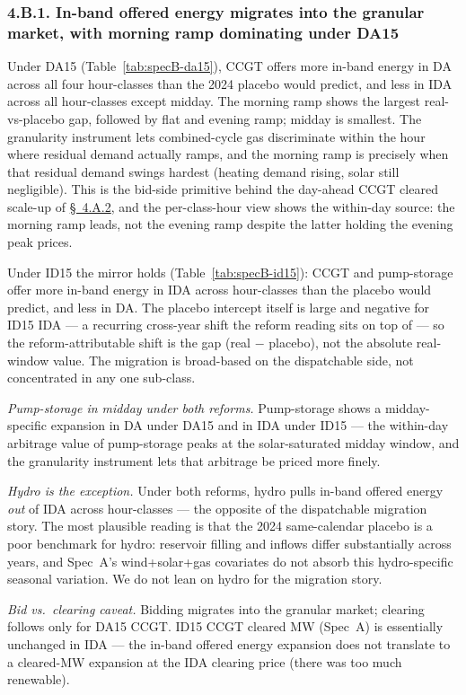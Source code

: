 \documentclass[11pt]{article}
\begin{document}
\subsubsection*{4.B.1. In-band offered energy migrates into the granular market, with morning ramp dominating under DA15}\label{sec:4v}
Under DA15 (Table~\ref{tab:specB-da15}), CCGT offers more in-band energy in DA across all four hour-classes than the 2024 placebo would predict, and less in IDA across all hour-classes except midday. The morning ramp shows the largest real-vs-placebo gap, followed by flat and evening ramp; midday is smallest. The granularity instrument lets combined-cycle gas discriminate within the hour where residual demand actually ramps, and the morning ramp is precisely when that residual demand swings hardest (heating demand rising, solar still negligible). This is the bid-side primitive behind the day-ahead CCGT cleared scale-up of \hyperref[sec:4iii]{\S~4.A.2}, and the per-class-hour view shows the within-day source: the morning ramp leads, not the evening ramp despite the latter holding the evening peak prices.

Under ID15 the mirror holds (Table~\ref{tab:specB-id15}): CCGT and pump-storage offer more in-band energy in IDA across hour-classes than the placebo would predict, and less in DA. The placebo intercept itself is large and negative for ID15 IDA --- a recurring cross-year shift the reform reading sits on top of --- so the reform-attributable shift is the gap (real $-$ placebo), not the absolute real-window value. The migration is broad-based on the dispatchable side, not concentrated in any one sub-class.

\emph{Pump-storage in midday under both reforms.} Pump-storage shows a midday-specific expansion in DA under DA15 and in IDA under ID15 --- the within-day arbitrage value of pump-storage peaks at the solar-saturated midday window, and the granularity instrument lets that arbitrage be priced more finely.

\emph{Hydro is the exception.} Under both reforms, hydro pulls in-band offered energy \emph{out} of IDA across hour-classes --- the opposite of the dispatchable migration story. The most plausible reading is that the 2024 same-calendar placebo is a poor benchmark for hydro: reservoir filling and inflows differ substantially across years, and Spec~A's wind+solar+gas covariates do not absorb this hydro-specific seasonal variation. We do not lean on hydro for the migration story.

\emph{Bid vs.\ clearing caveat.} Bidding migrates into the granular market; clearing follows only for DA15 CCGT. ID15 CCGT cleared MW (Spec~A) is essentially unchanged in IDA --- the in-band offered energy expansion does not translate to a cleared-MW expansion at the IDA clearing price (there was too much renewable).
\end{document}
